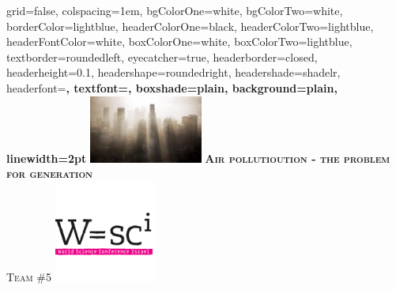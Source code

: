 \documentclass[landscape,final,a0paper,fontscale=0.285]{baposter}
\begin{document}
\begin{poster}%
  {
  grid=false,
  colspacing=1em,
  bgColorOne=white,
  bgColorTwo=white,
  borderColor=lightblue,
  headerColorOne=black,
  headerColorTwo=lightblue,
  headerFontColor=white,
  boxColorOne=white,
  boxColorTwo=lightblue,
  textborder=roundedleft,
  eyecatcher=true,
  headerborder=closed,
  headerheight=0.1\textheight,
  headershape=roundedright,
  headershade=shadelr,
  headerfont=\Large\bf\textsc, %
  textfont={\setlength{\parindent}{1.5em}},
  boxshade=plain,
  background=plain,
  linewidth=2pt
  }
  {\includegraphics[height=6em]{logo_left}} 
  {{\bf\textsc{Air pollutioution - the problem for generation}\vspace{0.5em}} \\ }
  {\textsc{Team \#5}}
  {%
    \includegraphics[height=9.0em]{logo_wsci}
  }

    \newcommand{\colouredcircle}{%
      \tikz{\useasboundingbox (-0.2em,-0.32em) rectangle(0.2em,0.32em); \draw[draw=black,fill=lightblue,line width=0.03em] (0,0) circle(0.18em);}}


\end{poster}
\end{document}
